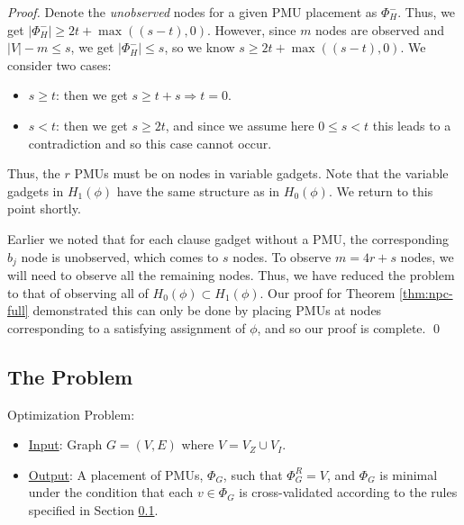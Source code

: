 \begin{proof}
Denote the {\em unobserved} nodes for a given PMU placement as $\Phi_H^-$. Thus, we get $|\Phi_H^-| \geq 2t + \max((s-t), 0)$. However, since $m$ nodes are observed and  $|V|-m \leq s$, we get $|\Phi_H^-| \leq s$, so we know $s \geq 2t + \max((s-t), 0)$. We consider two cases:
\begin{itemize}
	\item $s\geq t$: then we get $s \geq t + s \Rightarrow t=0.$
	\item $s < t$:	then we get $s \geq 2t$, and since we assume here $0\leq s < t$ this leads to a contradiction and so this case cannot occur.
\end{itemize}

Thus, the $r$ PMUs must be on nodes in variable gadgets. Note that the variable gadgets in $H_1(\phi)$ have the same structure as in $H_0(\phi)$. We return to this point shortly.

Earlier we noted that for each clause gadget without a PMU, the corresponding $b_j$ node is unobserved, which comes to $s$ nodes. To observe $m=4r+s$ nodes, we will need to observe all the remaining nodes. Thus, we have reduced the problem to that of observing all of $H_0(\phi)\subset H_1(\phi)$. Our proof for Theorem \ref{thm:npc-full} demonstrated this can only be done by placing PMUs at nodes corresponding to a satisfying assignment of $\phi$, and so our proof is complete. \qed
\end{proof}


\subsection{The \xval Problem}
\label{subsec:xval}


\xval Optimization Problem:
\begin{itemize}
	\item \underline{Input}: Graph $G=(V,E)$ where $V=V_Z \cup V_I$.

	\item \underline{Output}: A placement of PMUs, $\Phi_G$, such that $\Phi^R_G = V$,
	and  $\Phi_G$ is minimal under the condition that each $v \in \Phi_G$ is cross-validated according to the rules specified in Section \ref{subsec:xval}.
\end{itemize}

